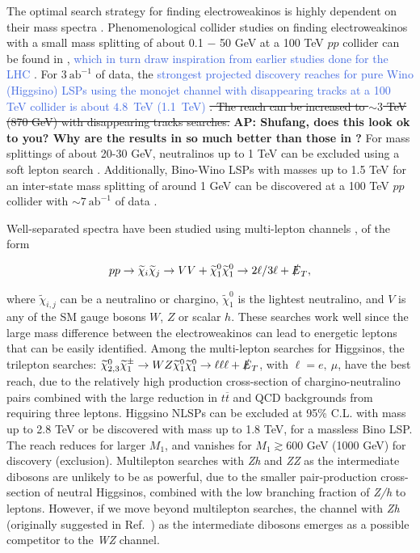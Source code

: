 \documentclass[a4paper,11pt]{article}
\newcommand{\Adarsh}[1]{{\bf\color{RoyalBlue} AP: #1}}
\newcommand{\ap}[1]{\textcolor{RoyalBlue}{#1}}
\newcommand{\N}{\widetilde{\chi}^0}
\newcommand{\C}{\widetilde{\chi}^\pm}
\newcommand{\met}{{\slashed{E}_T}}
\begin{document}
The optimal search strategy for finding electroweakinos is highly dependent on
their mass spectra \cite{Han:2013kza}. Phenomenological collider studies on
finding electroweakinos with a small mass splitting of about 0.1 $-$ 50 GeV at a
100 TeV $pp$  collider can be found in \cite{Low:2014cba, Bramante:2014tba,
  Berlin:2015aba, Cirelli:2014dsa, Mahbubani:2017gjh, Mahbubani:2018tin,
Fukuda:2017jmk, Saito:2019rtg},
  \ap{which in turn draw inspiration from earlier
studies done for the LHC \cite{Giudice:2010wb, Gori:2013ala, Han:2013usa,
Schwaller:2013baa, Baer:2014cua, Han:2014kaa}}.
For $3\ \text{ab}^{-1}$ of data, the \ap{strongest projected discovery reaches for pure Wino
(Higgsino) LSPs using the monojet channel with disappearing tracks at a 100 TeV
collider is about $4.8$~TeV (1.1~TeV) \cite{Saito:2019rtg}}\st{. The reach
can be increased to $\sim3$ TeV (870 GeV) with disappearing tracks
searches.}\Adarsh{Shufang, does this look ok to you? Why are the results in
\cite{Saito:2019rtg} so much better than those in \cite{Low:2014cba}?} 
For mass splittings of about 20-30 GeV, neutralinos up to 1 TeV can be excluded 
using a soft lepton search \cite{Low:2014cba}. Additionally, Bino-Wino LSPs
with masses up to 1.5 TeV for an inter-state mass splitting of around 1 GeV  can be
discovered at a 100 TeV $pp$ collider with $\sim7\ \text{ab}^{-1}$
of data \cite{Bramante:2014tba}.

Well-separated spectra have been studied using multi-lepton channels
\cite{Gori:2014oua, Acharya:2014pua}, of the form 

\begin{align}
  pp\rightarrow \widetilde{\chi}_i\widetilde{\chi}_j\rightarrow VV +
  \N_1\N_1\rightarrow 2\ell/3\ell + \met,
\end{align} 

\noindent where $\widetilde{\chi}_{i,j}$ can be a neutralino or chargino, $\N_1$
is the lightest neutralino, and $V$ is any of the SM gauge bosons $W$, $Z$
or scalar $h$.  These searches work well since the large mass difference
between the electroweakinos can lead to energetic leptons that can be easily
identified. Among the multi-lepton searches for Higgsinos, the trilepton
searches: $\N_{2,3}\C_1\rightarrow WZ\N_1\N_1\rightarrow \ell\ell\ell +
\met$, with $\ell=e, \ \mu$,  have the best reach, due to the relatively high
production cross-section of chargino-neutralino pairs combined with the large
reduction in $t\overline{t}$ and QCD backgrounds from requiring three
leptons.  Higgsino NLSPs can be excluded at 95\% C.L. with mass up to 2.8 TeV
or be discovered with  mass up to 1.8 TeV, for a massless Bino LSP.   The reach
reduces for larger $M_1$, and vanishes for $M_1\gtrsim 600$ GeV (1000 GeV)
for discovery (exclusion).  Multilepton searches with \emph{Zh} and \emph{ZZ}
as the intermediate dibosons are unlikely to be as powerful, due to the smaller
pair-production cross-section of neutral Higgsinos, combined with the low
branching fraction of \emph{Z/h} to leptons. However, if we move beyond
multilepton searches, the channel with \emph{Zh} (originally suggested in
Ref.~\cite{Han:2013kza}) as the intermediate dibosons emerges as a possible
competitor to the \emph{WZ} channel.  
\end{document}
